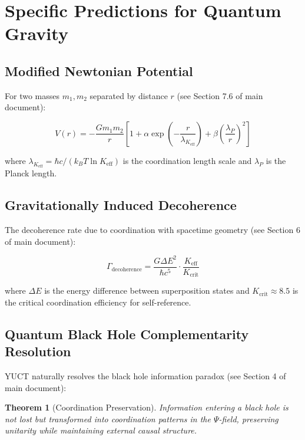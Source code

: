 \documentclass[12pt,a4paper]{article}
\newtheorem{theorem}{Theorem}[section]
\theoremstyle{remark}
\newcommand{\Keff}{K_{\mathrm{eff}}}
\begin{document}
	\section{Specific Predictions for Quantum Gravity}
	\label{sec:predictions}
	
	\subsection{Modified Newtonian Potential}
	
	For two masses $m_1, m_2$ separated by distance $r$ (see Section 7.6 of main document):
	
	\begin{equation}
		V(r) = -\frac{G m_1 m_2}{r} \left[ 1 + \alpha \exp\left(-\frac{r}{\lambda_{\Keff}}\right) + \beta \left(\frac{\lambda_P}{r}\right)^2 \right]
	\end{equation}
	
	where $\lambda_{\Keff} = \hbar c / (k_B T \ln \Keff)$ is the coordination length scale and $\lambda_P$ is the Planck length.
	
	\subsection{Gravitationally Induced Decoherence}
	
	The decoherence rate due to coordination with spacetime geometry (see Section 6 of main document):
	
	\begin{equation}
		\Gamma_{\text{decoherence}} = \frac{G \Delta E^2}{\hbar c^5} \cdot \frac{\Keff}{K_{\text{crit}}}
	\end{equation}
	
	where $\Delta E$ is the energy difference between superposition states and $K_{\text{crit}} \approx 8.5$ is the critical coordination efficiency for self-reference.
	
	\subsection{Quantum Black Hole Complementarity Resolution}
	
	YUCT naturally resolves the black hole information paradox (see Section 4 of main document):
	
	\begin{theorem}[Coordination Preservation]
		Information entering a black hole is not lost but transformed into coordination patterns in the $\Psi$-field, preserving unitarity while maintaining external causal structure.
	\end{theorem}
	
\end{document}
